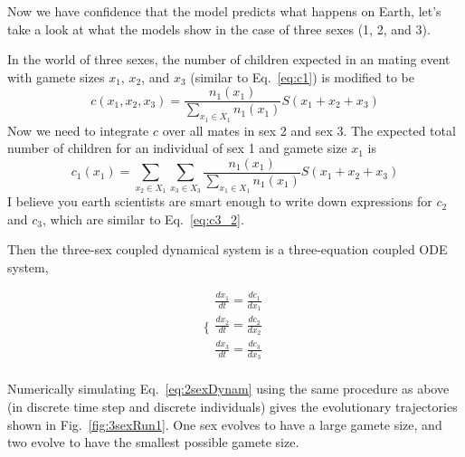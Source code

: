 Now we have confidence that the model predicts what happens on Earth, let's take a look at what the models show in the case of three sexes (1, 2, and 3). 

In the world of three sexes, the number of children expected in an mating event with gamete sizes $x_1$, $x_2$, and $x_3$ (similar to Eq.~\ref{eq:c1}) is modified to be
\begin{equation}\label{eq:c3_1}
    c(x_1, x_2, x_3) = \frac{n_1(x_1)}{\sum_{x_1\in X_1} n_1(x_1)} S(x_1+ x_2 + x_3)
\end{equation}
Now we need to integrate $c$ over all mates in sex 2 and sex 3. The expected total number of children for an individual of sex 1 and gamete size $x_1$ is
\begin{equation} \label{eq:c3_2}
    c_1(x_1) = \sum_{x_2 \in X_1} \sum_{x_3 \in X_3}
   \frac{n_1(x_1)}{\sum_{x_1\in X_1} n_1(x_1)} S(x_1+ x_2 + x_3) 
\end{equation}
I believe you earth scientists are smart enough to write down expressions for $c_2$ and $c_3$, which are similar to Eq.~\ref{eq:c3_2}. 

Then the three-sex coupled dynamical system is a three-equation coupled ODE system, 



\begin{equation} \label{eq:3sexDynam}
\Bigg\{
\begin{array}{ll}
\frac{dx_1}{dt} = \frac{dc_1}{dx_1} \\
\frac{dx_2}{dt} = \frac{dc_2}{dx_2}  \\
\frac{dx_3}{dt} = \frac{dc_3}{dx_3} \\
\end{array}
\end{equation}

Numerically simulating Eq.~\ref{eq:2sexDynam} using the same procedure as above (in discrete time step and discrete individuals) gives the evolutionary trajectories shown in Fig.~\ref{fig:3sexRun1}. One sex evolves to have a large gamete size, and two evolve to have the smallest possible gamete size.

